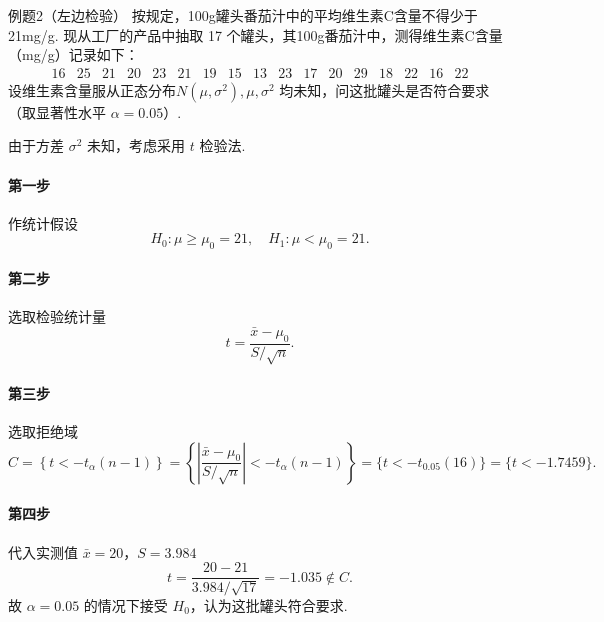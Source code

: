 \begin{question}{例题2（左边检验）}
    按规定，100g罐头番茄汁中的平均维生素C含量不得少于 21mg/g. 现从工厂的产品中抽取 17 个罐头，其100g番茄汁中，测得维生素C含量（mg/g）记录如下：
    $$
        \begin{array}{ccccccccccccccccc}
            16 & 25 & 21 & 20 & 23 & 21 & 19 & 15 & 13 & 23 & 17 & 20 & 29 & 18 & 22 & 16 & 22
        \end{array}
    $$
    设维生素含量服从正态分布$N(\mu, \sigma^2), \mu, \sigma^2$ 均未知，问这批罐头是否符合要求（取显著性水平 $\alpha=0.05$）.
\end{question}
\begin{solution}
    由于方差 $\sigma^2$ 未知，考虑采用 $t$ 检验法.
    \paragraph{第一步} 作统计假设
    $$
        H_0: \mu \geqslant \mu_0 = 21, \quad H_1: \mu < \mu_0 = 21.
    $$
    \paragraph{第二步} 选取检验统计量
    $$
        t = \frac{\bar{x}-\mu_0}{S/\sqrt{n}} .
    $$
    \paragraph{第三步} 选取拒绝域
    $$
        C = \left\{t<-t_{\alpha}(n-1)\right\}
        = \left\{\left|\frac{\bar{x}-\mu_0}{S/\sqrt{n}}\right|<-t_{\alpha}(n-1)\right\}
        = \{t<-t_{0.05}(16)\}
        = \{t<-1.7459\}.
    $$
    \paragraph{第四步} 代入实测值 $\bar{x}=20$，$S=3.984$
    $$
        t = \frac{20-21}{3.984/\sqrt{17}} = -1.035 \notin C.
    $$
    故 $\alpha = 0.05$ 的情况下接受 $H_0$，认为这批罐头符合要求.
\end{solution}



